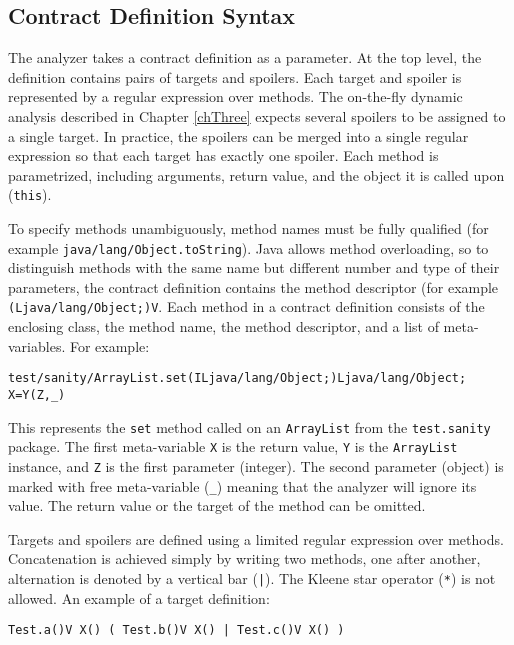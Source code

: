 \subsection{Contract Definition Syntax}

The analyzer takes a contract definition as a parameter. At the top level, the
definition contains pairs of targets and spoilers. Each target and spoiler is
represented by a regular expression over methods. The on-the-fly dynamic
analysis described in Chapter \ref{chThree} expects several spoilers to be
assigned to a single target. In practice, the spoilers can be merged into a
single regular expression so that each target has exactly one spoiler. Each
method is parametrized, including arguments, return value, and the object it is
called upon (\texttt{this}).

To specify methods unambiguously, method names must be fully qualified (for
example \texttt{java/lang/Object.toString}). Java allows method overloading, so
to distinguish methods with the same name but different number and type of their
parameters, the contract definition contains the method descriptor (for example
\texttt{(Ljava/lang/Object;)V}. Each method in a contract definition consists of
the enclosing class, the method name, the method descriptor, and a list of
meta-variables. For example:

\begin{lstlisting}
test/sanity/ArrayList.set(ILjava/lang/Object;)Ljava/lang/Object; X=Y(Z,_)
\end{lstlisting}

This represents the \texttt{set} method called on an \texttt{ArrayList} from
the \texttt{test.sanity} package. The first meta-variable \texttt{X} is the
return value, \texttt{Y} is the \texttt{ArrayList} instance, and \texttt{Z} is
the first parameter (integer). The second parameter (object) is marked with free
meta-variable (\texttt{\_}) meaning that the analyzer will ignore its value. The
return value or the target of the method can be omitted.

Targets and spoilers are defined using a limited regular expression over
methods. Concatenation is achieved simply by writing two methods, one after
another, alternation is denoted by a vertical bar (\texttt{|}). The Kleene star
operator (\texttt{*}) is not allowed. An example of a target definition:

\begin{lstlisting}
Test.a()V X() ( Test.b()V X() | Test.c()V X() )
\end{lstlisting}

